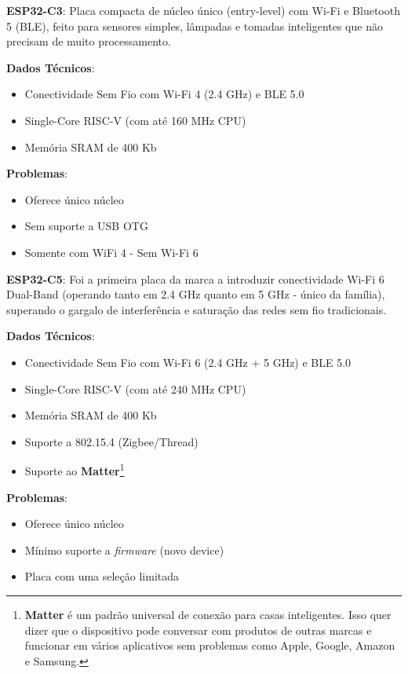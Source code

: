 \documentclass[a4paper,11pt]{article}
\begin{document}
\textbf{ESP32-C3}: Placa compacta de núcleo único (entry-level) com Wi-Fi e Bluetooth 5 (BLE), feito para sensores simples, lâmpadas e tomadas inteligentes que não precisam de muito processamento.

\textbf{Dados Técnicos}: \vspace{-1em}
\begin{itemize}[nolistsep]
	\item Conectividade Sem Fio	com Wi-Fi 4 (2.4 GHz) e BLE 5.0
	\item Single-Core RISC-V (com até 160 MHz CPU)
	\item Memória SRAM de 400 Kb
\end{itemize}

\textbf{Problemas}: \vspace{-1em}
\begin{itemize}[nolistsep]
	\item Oferece único núcleo
	\item Sem suporte a USB OTG
	\item Somente com WiFi 4 - Sem Wi-Fi 6
\end{itemize}

\textbf{ESP32-C5}: Foi a primeira placa da marca a introduzir conectividade Wi-Fi 6 Dual-Band (operando tanto em 2.4 GHz quanto em 5 GHz - único da família), superando o gargalo de interferência e saturação das redes sem fio tradicionais.

\textbf{Dados Técnicos}: \vspace{-1em}
\begin{itemize}[nolistsep]
	\item Conectividade Sem Fio	com Wi-Fi 6 (2.4 GHz + 5 GHz) e BLE 5.0
	\item Single-Core RISC-V (com até 240 MHz CPU)
	\item Memória SRAM de 400 Kb
	\item Suporte a 802.15.4 (Zigbee/Thread)
	\item Suporte ao \textbf{Matter}\footnote{\textbf{Matter} é um padrão universal de conexão para casas inteligentes. Isso quer dizer que o dispositivo pode conversar com produtos de outras marcas e funcionar em vários aplicativos sem problemas como Apple, Google, Amazon e Samsung.}
\end{itemize}

\textbf{Problemas}: \vspace{-1em}
\begin{itemize}[nolistsep]
	\item Oferece único núcleo
	\item Mínimo suporte a \textit{firmware} (novo device)
	\item Placa com uma seleção limitada
\end{itemize}
\end{document}

